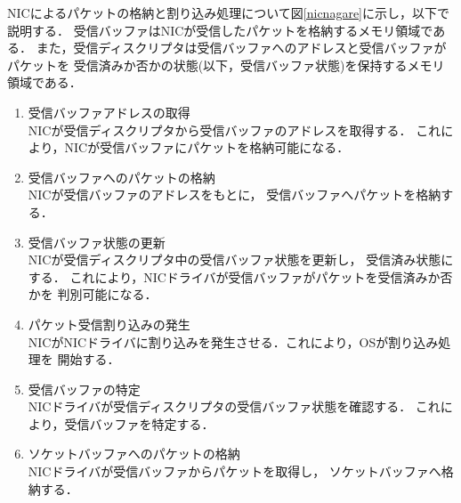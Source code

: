 \documentclass[tanilab-enum]{graduate}
\begin{document}
NICによるパケットの格納と割り込み処理について図\ref{nicnagare}に示し，以下で説明する．
受信バッファはNICが受信したパケットを格納するメモリ領域である．
また，受信ディスクリプタは受信バッファへのアドレスと受信バッファがパケットを
受信済みか否かの状態(以下，受信バッファ状態)を保持するメモリ領域である．
\begin{enumerate}
    \item 受信バッファアドレスの取得\\
        NICが受信ディスクリプタから受信バッファのアドレスを取得する．
        これにより，NICが受信バッファにパケットを格納可能になる．
    \item 受信バッファへのパケットの格納\\
        NICが受信バッファのアドレスをもとに，
        受信バッファへパケットを格納する．
    \item 受信バッファ状態の更新\\
        NICが受信ディスクリプタ中の受信バッファ状態を更新し，
        受信済み状態にする．
        これにより，NICドライバが受信バッファがパケットを受信済みか否かを
        判別可能になる．
    \item パケット受信割り込みの発生\\
        NICがNICドライバに割り込みを発生させる．これにより，OSが割り込み処理を
        開始する．
    \item 受信バッファの特定\\
        NICドライバが受信ディスクリプタの受信バッファ状態を確認する．
        これにより，受信バッファを特定する．
    \item ソケットバッファへのパケットの格納\\
        NICドライバが受信バッファからパケットを取得し，
        ソケットバッファへ格納する．
\end{enumerate}
\end{document}
